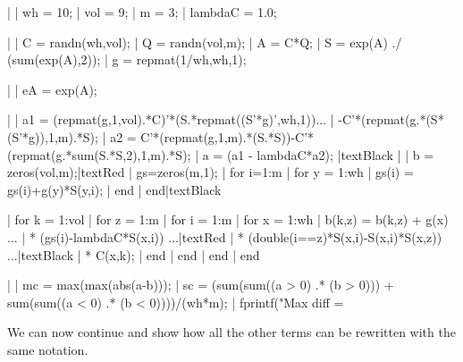 | %
| wh = 10;
| vol = 9;
| m = 3;
| lambdaC = 1.0;
 
| %
| C = randn(wh,vol);
| Q = randn(vol,m);
| A = C*Q;
| S = exp(A) ./ (sum(exp(A),2));
| g = repmat(1/wh,wh,1);
 
| %
| eA = exp(A);
 
| %
| a1 = (repmat(g,1,vol).*C)'*(S.*repmat((S'*g)',wh,1))...
|       -C'*(repmat(g.*(S*(S'*g)),1,m).*S);
| a2 = C'*(repmat(g,1,m).*(S.*S))-C'*(repmat(g.*sum(S.*S,2),1,m).*S);
| a = (a1 - lambdaC*a2);
|textBlack 
| %
| b = zeros(vol,m);|textRed
| gs=zeros(m,1);
| for i=1:m
| for y = 1:wh
|     gs(i) = gs(i)+g(y)*S(y,i);
| end
| end|textBlack
 
| for k = 1:vol
|     for z = 1:m
|         for i = 1:m
|             for x = 1:wh
|                 b(k,z) = b(k,z) + g(x) ...
|                     * (gs(i)-lambdaC*S(x,i)) ...|textRed
|                     * (double(i==z)*S(x,i)-S(x,i)*S(x,z)) ...|textBlack
|                     * C(x,k);
|             end
|         end
|     end
| end
 
| %
| mc = max(max(abs(a-b)));
| sc = (sum(sum((a > 0) .* (b > 0))) + sum(sum((a < 0) .* (b < 0))))/(wh*m);
| fprintf("Max diff = %
\endtt

We can now continue and show how all the other terms can be
rewritten with the same notation.

\bye